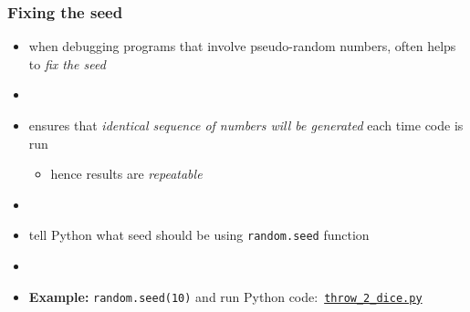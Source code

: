\documentclass[english,14pt]{beamer}
\newcommand\red[1]{{\color{red} #1}}
\begin{document}

\begin{frame}[fragile]

\frametitle{Fixing the seed}

\begin{itemize}
	\item when debugging programs that involve pseudo-random numbers, often helps to \red{\emph{fix the seed}}
	\item[]
	\item ensures that \emph{identical sequence of numbers will be generated} each time code is run
	\begin{itemize}
		\item hence results are \emph{repeatable}
	\end{itemize}
	\item[]
	\item tell Python what seed should be using \texttt{random.seed} function
	\item[]
	\item \textbf{Example:} \texttt{random.seed(10)} and run Python code:~\href{https://github.com/slgit/prog4comp_2/blob/master/py36-src/throw_2_dice.py}{\texttt{throw\_2\_dice.py}}
\end{itemize}

\end{frame}

\end{document}
